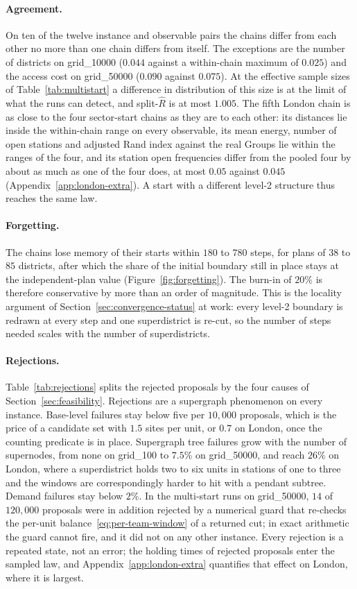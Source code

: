 \paragraph{Agreement.}
On ten of the twelve instance and observable pairs the chains differ from each other no more than one chain differs from itself. The exceptions are the number of districts on grid\_10000 ($0.044$ against a within-chain maximum of $0.025$) and the access cost on grid\_50000 ($0.090$ against $0.075$). At the effective sample sizes of Table~\ref{tab:multistart} a difference in distribution of this size is at the limit of what the runs can detect, and split-$\hat R$ is at most $1.005$. The fifth London chain is as close to the four sector-start chains as they are to each other: its distances lie inside the within-chain range on every observable, its mean energy, number of open stations and adjusted Rand index against the real Groups lie within the ranges of the four, and its station open frequencies differ from the pooled four by about as much as one of the four does, at most $0.05$ against $0.045$ (Appendix~\ref{app:london-extra}). A start with a different level-2 structure thus reaches the same law.

\paragraph{Forgetting.}
The chains lose memory of their starts within $180$ to $780$ steps, for plans of $38$ to $85$ districts, after which the share of the initial boundary still in place stays at the independent-plan value (Figure~\ref{fig:forgetting}). The burn-in of $20\%$ is therefore conservative by more than an order of magnitude. This is the locality argument of Section~\ref{sec:convergence-status} at work: every level-2 boundary is redrawn at every step and one superdistrict is re-cut, so the number of steps needed scales with the number of superdistricts.

\paragraph{Rejections.}
Table~\ref{tab:rejections} splits the rejected proposals by the four causes of Section~\ref{sec:feasibility}. Rejections are a supergraph phenomenon on every instance. Base-level failures stay below five per $10{,}000$ proposals, which is the price of a candidate set with $1.5$ sites per unit, or $0.7$ on London, once the counting predicate is in place. Supergraph tree failures grow with the number of supernodes, from none on grid\_100 to $7.5\%$ on grid\_50000, and reach $26\%$ on London, where a superdistrict holds two to six units in stations of one to three and the windows are correspondingly harder to hit with a pendant subtree. Demand failures stay below $2\%$. In the multi-start runs on grid\_50000, $14$ of $120{,}000$ proposals were in addition rejected by a numerical guard that re-checks the per-unit balance~\eqref{eq:per-team-window} of a returned cut; in exact arithmetic the guard cannot fire, and it did not on any other instance. Every rejection is a repeated state, not an error; the holding times of rejected proposals enter the sampled law, and Appendix~\ref{app:london-extra} quantifies that effect on London, where it is largest.

